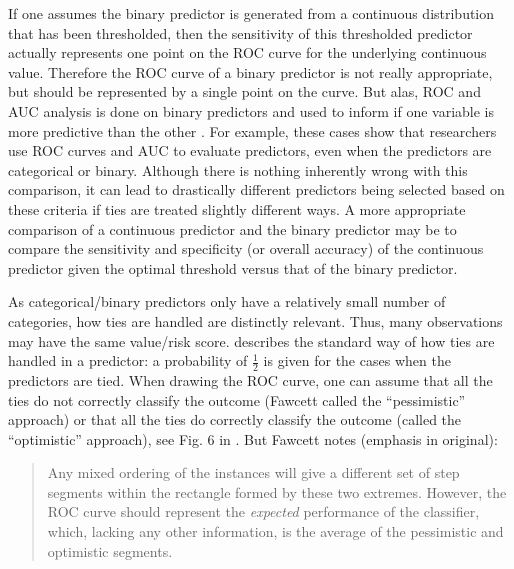 \documentclass[12pt]{article}
\begin{document}
If one assumes the binary predictor is generated from a continuous
distribution that has been thresholded, then the sensitivity of this
thresholded predictor actually represents one point on the ROC curve for
the underlying continuous value. Therefore the ROC curve of a binary
predictor is not really appropriate, but should be represented by a
single point on the curve. But alas, ROC and AUC analysis is done on
binary predictors and used to inform if one variable is more predictive
than the other
\citetext{\citealp{jama}; \citealp{jama2}; \citealp{glaveckaite2011value}; \citealp{blumberg2016technology}; \citealp{budwega2016factors}; \citealp{mwipatayi2016durability}; \citealp[\citet{shterev2018bayesian}]{xiong2018comparison}; \citealp{kushnir2018degree}; \citealp{snarr2017parasternal}; \citealp{veltri2018deep}}.
For example, these cases show that researchers use ROC curves and AUC to
evaluate predictors, even when the predictors are categorical or binary.
Although there is nothing inherently wrong with this comparison, it can
lead to drastically different predictors being selected based on these
criteria if ties are treated slightly different ways. A more appropriate
comparison of a continuous predictor and the binary predictor may be to
compare the sensitivity and specificity (or overall accuracy) of the
continuous predictor given the optimal threshold versus that of the
binary predictor.

As categorical/binary predictors only have a relatively small number of
categories, how ties are handled are distinctly relevant. Thus, many
observations may have the same value/risk score.
\citet{fawcett2006introduction} describes the standard way of how ties
are handled in a predictor: a probability of \(\frac{1}{2}\) is given
for the cases when the predictors are tied. When drawing the ROC curve,
one can assume that all the ties do not correctly classify the outcome
(Fawcett called the ``pessimistic'' approach) or that all the ties do
correctly classify the outcome (called the ``optimistic'' approach), see
Fig. 6 in \citep{fawcett2006introduction}. But Fawcett notes (emphasis
in original):

\begin{quote}
Any mixed ordering of the instances will give a different set of step
segments within the rectangle formed by these two extremes. However, the
ROC curve should represent the \emph{expected} performance of the
classifier, which, lacking any other information, is the average of the
pessimistic and optimistic segments.
\end{quote}
\end{document}
